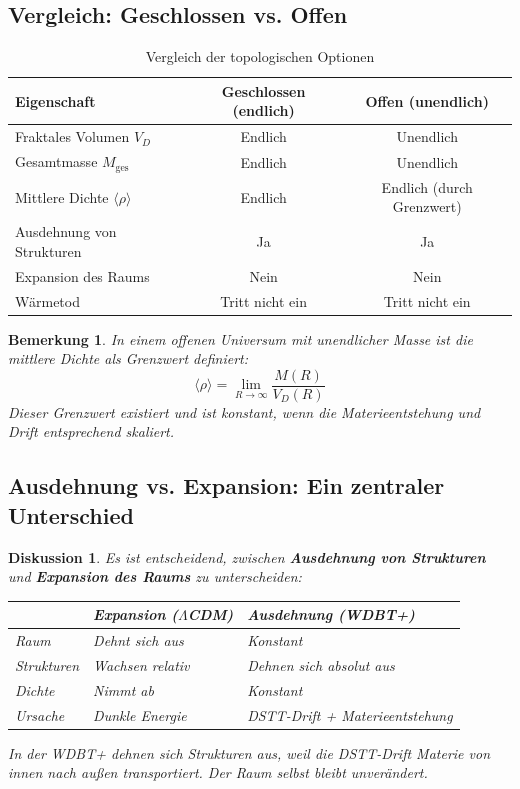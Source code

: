 \documentclass[12pt,a4paper]{article}
\newtheorem{bemerkung}{Bemerkung}
\newtheorem{diskussion}{Diskussion}
\begin{document}
\subsection{Vergleich: Geschlossen vs. Offen}

\begin{table}[h]
\centering
\caption{Vergleich der topologischen Optionen}
\begin{tabular}{|l|c|c|}
\hline
\textbf{Eigenschaft} & \textbf{Geschlossen (endlich)} & \textbf{Offen (unendlich)} \\ \hline
Fraktales Volumen $V_D$ & Endlich & Unendlich \\ \hline
Gesamtmasse $M_{\text{ges}}$ & Endlich & Unendlich \\ \hline
Mittlere Dichte $\langle \rho \rangle$ & Endlich & Endlich (durch Grenzwert) \\ \hline
Ausdehnung von Strukturen & Ja & Ja \\ \hline
Expansion des Raums & Nein & Nein \\ \hline
Wärmetod & Tritt nicht ein & Tritt nicht ein \\ \hline
\end{tabular}
\end{table}

\begin{bemerkung}
In einem offenen Universum mit unendlicher Masse ist die mittlere Dichte als Grenzwert definiert:
\begin{equation}
\langle \rho \rangle = \lim_{R \to \infty} \frac{M(R)}{V_D(R)}
\end{equation}
Dieser Grenzwert existiert und ist konstant, wenn die Materieentstehung und Drift entsprechend skaliert.
\end{bemerkung}

\subsection{Ausdehnung vs. Expansion: Ein zentraler Unterschied}

\begin{diskussion}
Es ist entscheidend, zwischen \textbf{Ausdehnung von Strukturen} und \textbf{Expansion des Raums} zu unterscheiden:

\begin{center}
\begin{tabular}{|l|l|l|}
\hline
& \textbf{Expansion ($\Lambda$CDM)} & \textbf{Ausdehnung (WDBT+)} \\ \hline
Raum & Dehnt sich aus & Konstant \\ \hline
Strukturen & Wachsen relativ & Dehnen sich absolut aus \\ \hline
Dichte & Nimmt ab & Konstant \\ \hline
Ursache & Dunkle Energie & DSTT-Drift + Materieentstehung \\ \hline
\end{tabular}
\end{center}

In der WDBT+ dehnen sich Strukturen aus, weil die DSTT-Drift Materie von innen nach außen transportiert. Der Raum selbst bleibt unverändert.
\end{diskussion}
\end{document}
